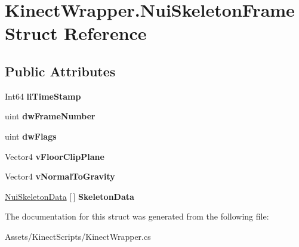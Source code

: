\hypertarget{struct_kinect_wrapper_1_1_nui_skeleton_frame}{}\section{Kinect\+Wrapper.\+Nui\+Skeleton\+Frame Struct Reference}
\label{struct_kinect_wrapper_1_1_nui_skeleton_frame}
\subsection*{Public Attributes}
\begin{DoxyCompactItemize}
\item 
\mbox{\label{struct_kinect_wrapper_1_1_nui_skeleton_frame_ae1a802eedfd2fa7734997aa6b50377df}} 
Int64 {\bfseries li\+Time\+Stamp}
\item 
\mbox{\label{struct_kinect_wrapper_1_1_nui_skeleton_frame_abb544866679b55667550df75368fd743}} 
uint {\bfseries dw\+Frame\+Number}
\item 
\mbox{\label{struct_kinect_wrapper_1_1_nui_skeleton_frame_a462a1d2f769d87f08e6ff3433c0930f1}} 
uint {\bfseries dw\+Flags}
\item 
\mbox{\label{struct_kinect_wrapper_1_1_nui_skeleton_frame_a23992f6462fa532b7c8a60379eb01e97}} 
Vector4 {\bfseries v\+Floor\+Clip\+Plane}
\item 
\mbox{\label{struct_kinect_wrapper_1_1_nui_skeleton_frame_a5281e1a39eeda48cd88851cfcda6caf1}} 
Vector4 {\bfseries v\+Normal\+To\+Gravity}
\item 
\mbox{\label{struct_kinect_wrapper_1_1_nui_skeleton_frame_ae130c1490c24b8354fb344989f556ade}} 
\mbox{\hyperlink{struct_kinect_wrapper_1_1_nui_skeleton_data}{Nui\+Skeleton\+Data}} \mbox{[}$\,$\mbox{]} {\bfseries Skeleton\+Data}
\end{DoxyCompactItemize}


The documentation for this struct was generated from the following file\+:\begin{DoxyCompactItemize}
\item 
Assets/\+Kinect\+Scripts/Kinect\+Wrapper.\+cs\end{DoxyCompactItemize}
